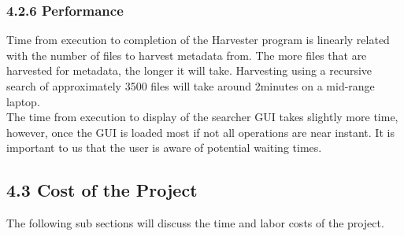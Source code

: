 \documentclass[11pt]{article}
\begin{document}
\begin{adjustwidth}{1cm}{}
\subsubsection{4.2.6 Performance}
Time from execution to completion of the Harvester program is linearly related with the number of files to harvest metadata from. The more files that are harvested for metadata, the longer it will take. Harvesting using a recursive search of approximately 3500 files will take around 2minutes on a mid-range laptop. \\

The time from execution to display of the searcher GUI takes slightly more time, however, once the GUI is loaded most if not all operations are near instant. It is important to us that the user is aware of potential waiting times.

\end{adjustwidth}

\subsection{4.3 Cost of the Project}
The following sub sections will discuss the time and labor costs of the project.
\end{document}
